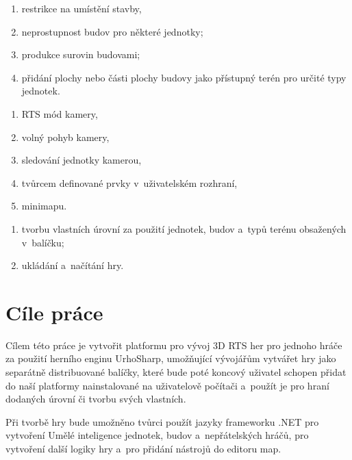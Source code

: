 \begin{enumerate}
	\item restrikce na umístění stavby,
	\item neprostupnost budov pro některé jednotky;
	\item produkce surovin budovami;
	\item přidání plochy nebo části plochy budovy jako přístupný terén pro určité typy jednotek.
\end{enumerate}

\begin{enumerate}
	\item RTS mód kamery,
	\item volný pohyb kamery,
	\item sledování jednotky kamerou,
	\item tvůrcem definované prvky v~uživatelském rozhraní,
	\item minimapu.
\end{enumerate}

\begin{enumerate}
	\item tvorbu vlastních úrovní za použití jednotek, budov a~typů terénu obsažených v~balíčku;
	\item ukládání a~načítání hry.
\end{enumerate}

\section{Cíle práce}
\label{sec:cileprace}
Cílem této práce je vytvořit platformu pro vývoj 3D RTS her pro jednoho hráče za použití herního enginu UrhoSharp, umožňující vývojářům vytvářet hry jako separátně 
distribuované balíčky, které bude poté koncový uživatel schopen přidat do naší platformy nainstalované na uživatelově počítači a~použít je pro hraní dodaných úrovní či tvorbu svých vlastních.

Při tvorbě hry bude umožněno tvůrci použít jazyky frameworku .NET  pro vytvoření Umělé inteligence jednotek, budov a~nepřátelských hráčů, pro vytvoření další logiky hry a~pro přidání nástrojů do editoru map. 

